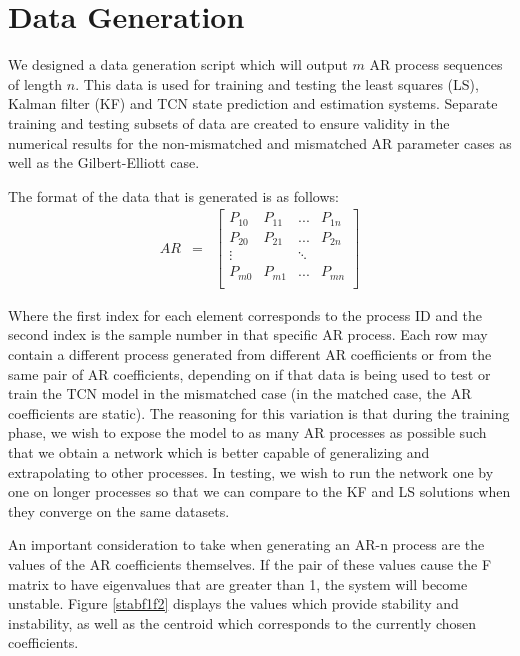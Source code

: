 \documentclass[twocolumn,letterpaper]{IEEEAerospaceCLS}  %
\begin{document}
\section{Data Generation}

\label{sec:dgen}

We designed a data generation script which will output $m$ AR process sequences of length $n$. This data is used for training and testing the least squares (LS), Kalman filter (KF) and TCN state prediction and estimation systems. Separate training and testing subsets of data are created to ensure validity in the numerical results for the non-mismatched and mismatched AR parameter cases as well as the Gilbert-Elliott case.

The format of the data that is generated is as follows: 
\begin{eqnarray*}
AR&=&\begin{bmatrix} 
P_{10} & P_{11} & ... & P_{1n} \\
P_{20} & P_{21} & ... & P_{2n} \\
\vdots &  & \ddots &  \\
P_{m0} & P_{m1} & ... & P_{mn} \\
\end{bmatrix}
\end{eqnarray*}

Where the first index for each element corresponds to the process ID and the second index is the sample number in that specific AR process. Each row may contain a different process generated from different AR coefficients or from the same pair of AR coefficients, depending on if that data is being used to test or train the TCN model in the mismatched case (in the matched case, the AR coefficients are static). The reasoning for this variation is that during the training phase, we wish to expose the model to as many AR processes as possible such that we obtain a network which is better capable of generalizing and extrapolating to other processes. In testing, we wish to run the network one by one on longer processes so that we can compare to the KF and LS solutions when they converge on the same datasets.

An important consideration to take when generating an AR-n process are the values of the AR coefficients themselves. If the pair of these values cause the F matrix to have eigenvalues that are greater than 1, the system will become unstable. Figure \ref{stabf1f2} displays the values which provide stability and instability, as well as the centroid which corresponds to the currently chosen coefficients.
\end{document}
